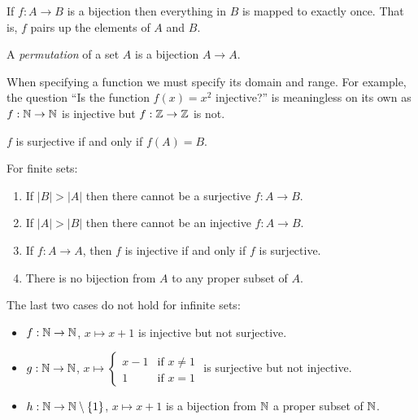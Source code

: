 \documentclass[../main.tex]{subfiles}
\begin{document}
If $f: A \to B$ is a bijection then everything in $B$ is mapped to exactly once. That is, $f$ pairs up the elements of $A$ and $B$.
\begin{definition}[Permutation]
 A \textit{permutation} of a set $A$ is a bijection $A \to A$.
\end{definition}
\begin{remark}[Warning]
  When specifying a function we must specify its domain and range.
  For example, the question ``Is the function $f(x) = x^2$ injective?'' is meaningless on its own as $f: \mathbb{N} \to \mathbb{N}$ is injective but $f: \mathbb{Z} \to \mathbb{Z}$ is not.
\end{remark}
\begin{remark}
  $f$ is surjective if and only if $f(A) = B$.
\end{remark}
\begin{remark}[Remarks]
  For finite sets:
  \begin{enumerate}
    \item If $|B| > |A|$ then there cannot be a surjective $f: A \to B$.
    \item If $|A| > |B|$ then there cannot be an injective $f: A \to B$.
    \item If $f: A \to A$, then $f$ is injective if and only if $f$ is surjective.
    \item There is no bijection from $A$ to any proper subset of $A$.
  \end{enumerate}
\end{remark}
\begin{remark}[Warning]
  The last two cases do not hold for infinite sets:
  \begin{itemize}
    \item $f: \mathbb{N} \to \mathbb{N}$, $x \mapsto x + 1$ is injective but not surjective.
    \item $g: \mathbb{N} \to \mathbb{N}$, $x \mapsto \begin{cases}
    x-1 & \text{if }x\neq1 \\
    1 & \text{if }x=1
    \end{cases}$ is surjective but not injective.
  \item $h: \mathbb{N} \to \mathbb{N} \setminus \{1\}$, $x \mapsto x + 1$ is a bijection from $\mathbb{N}$ a proper subset of $\mathbb{N}$.
  \end{itemize}
\end{remark}
\end{document}
